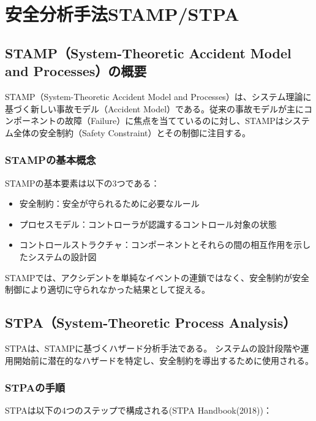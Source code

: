 \chapter{安全分析手法STAMP/STPA}
\label{chap3}



\section{STAMP（System-Theoretic Accident Model and Processes）の概要}

STAMP（System-Theoretic Accident Model and Processes）は、システム理論に基づく新しい事故モデル（Accident Model）である。従来の事故モデルが主にコンポーネントの故障（Failure）に焦点を当てているのに対し、STAMPはシステム全体の安全制約（Safety Constraint）とその制御に注目する。

\subsection{STAMPの基本概念}

STAMPの基本要素は以下の3つである： %

\begin{itemize}
    \item 安全制約：安全が守られるために必要なルール
    \item プロセスモデル：コントローラが認識するコントロール対象の状態
    \item コントロールストラクチャ：コンポーネントとそれらの間の相互作用を示したシステムの設計図
\end{itemize}

STAMPでは、アクシデントを単純なイベントの連鎖ではなく、安全制約が安全制御により適切に守られなかった結果として捉える。

\section{STPA（System-Theoretic Process Analysis）}

STPAは、STAMPに基づくハザード分析手法である。
システムの設計段階や運用開始前に潜在的なハザードを特定し、安全制約を導出するために使用される。

\subsection{STPAの手順}

STPAは以下の4つのステップで構成される(STPA Handbook(2018))：

